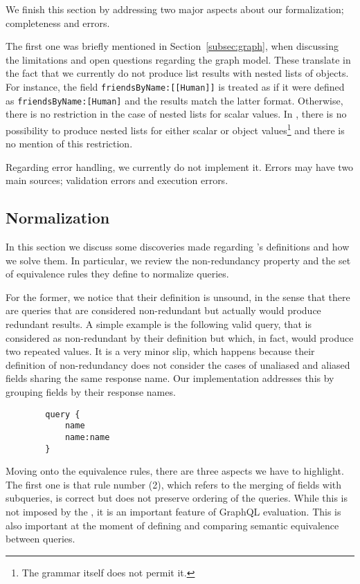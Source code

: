 We finish this section by addressing two major aspects about our formalization; completeness and errors.

The first one was briefly mentioned in Section~\ref{subsec:graph}, when discussing the limitations and open questions regarding the graph model. These translate in the fact that we currently do not produce list results with nested lists of objects. For instance, the field \texttt{friendsByName:[[Human]]} is treated as if it were defined as \texttt{friendsByName:[Human]} and the results match the latter format. Otherwise, there is no restriction in the case of nested lists for scalar values. In \HP{}, there is no possibility to produce nested lists for either scalar or object values\footnote{The grammar itself does not permit it.} and there is no mention of this restriction.

Regarding error handling, we currently do not implement it. Errors may have two main sources; validation errors and execution errors.

\subsection{Normalization}

In this section we discuss some discoveries made regarding \HP{}'s definitions and how we solve them. In particular, we review the non-redundancy property and the set of equivalence rules they define to normalize queries.

For the former, we notice that their definition is unsound, in the sense that there are queries that are considered non-redundant but actually would produce redundant results. A simple example is the following valid query, that is considered as non-redundant by their definition but which, in fact, would produce two repeated values. It is a very minor slip, which happens because their definition of non-redundancy does not consider the cases of unaliased and aliased fields sharing the same response name. Our implementation addresses this by grouping fields by their response names.

\begin{verbatim}
        query {
            name
            name:name
        }
\end{verbatim}


Moving onto the equivalence rules, there are three aspects we have to highlight. The first one is that rule number (2), which refers to the merging of fields with subqueries, is correct but does not preserve ordering of the queries. While this is not imposed by the \spec{}, it is an important feature of GraphQL evaluation. This is also important at the moment of defining and comparing semantic equivalence between queries.

